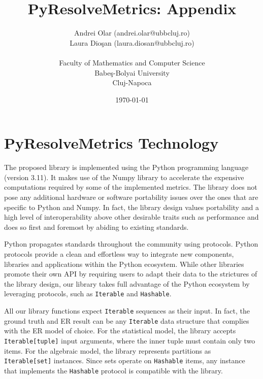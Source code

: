 \documentclass{article}
\title{PyResolveMetrics: Appendix}
\author{
    Andrei Olar (andrei.olar@ubbcluj.ro)\\
    Laura Dio\c san (laura.diosan@ubbcluj.ro)\\
    \\
    Faculty of Mathematics and Computer Science\\
    Babe\c s-Bolyai University\\
    Cluj-Napoca
}
\date{\today}
\begin{document}
\maketitle

\section{PyResolveMetrics Technology}\label{appendix:technology}
    The proposed library is implemented using the Python programming
    language (version 3.11)\cite{python}.
    It makes use of the Numpy library\cite{harris2020numpy} to accelerate
    the expensive computations required by some of the implemented metrics.
    The library does not pose any additional hardware or software portability
    issues over the ones that are specific to Python and Numpy.
    In fact, the library design values portability and a high level of
    interoperability above other desirable traits such as performance and does
    so first and foremost by abiding to existing standards.

    Python propagates standards throughout the community using protocols.
    Python protocols\cite{pyproto2017} provide a clean and effortless way to
    integrate new components, libraries and applications within the Python
    ecosystem.
    While other libraries\cite{nmeth2020scipy} promote their own API by
    requiring users to adapt their data to the strictures of the library design,
    our library takes full advantage of the Python ecosystem by leveraging
    protocols, such as \texttt{Iterable} and \texttt{Hashable}.

    All our library functions expect \texttt{Iterable} sequences as their input.
    In fact, the ground truth and ER result can be any
    \texttt{Iterable} data structure that complies with the ER
    model of choice.
    For the statistical model, the library accepts \texttt{Iterable[tuple]}
    input arguments, where the inner tuple must contain only two items.
    For the algebraic model, the library represents partitions as
    \texttt{Iterable[set]} instances.
    Since sets operate on \texttt{Hashable} items, any instance that implements
    the \texttt{Hashable} protocol is compatible with the library.
    
\end{document}
